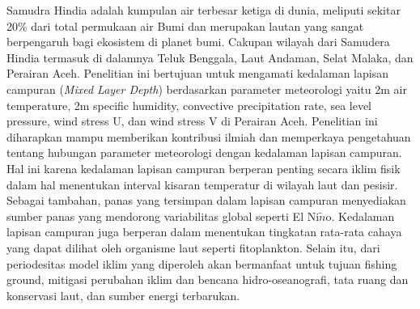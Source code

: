 \begin{spacing}{1.5}
	\pagestyle{empty}
	\begin{center}
		\vskip 1cm
		\justifying
		Samudra Hindia adalah kumpulan air terbesar ketiga di dunia, meliputi sekitar 20\% dari total permukaan air Bumi dan merupakan lautan yang sangat berpengaruh bagi ekosistem di planet bumi. Cakupan wilayah dari Samudera Hindia termasuk di dalamnya Teluk Benggala, Laut Andaman, Selat Malaka, dan Perairan Aceh. Penelitian ini bertujuan untuk mengamati kedalaman lapisan campuran (\textit{Mixed Layer Depth}) berdasarkan parameter meteorologi yaitu 2m air temperature, 2m specific humidity, convective precipitation rate, sea level pressure, wind stress U, dan wind stress V di Perairan Aceh. Penelitian ini diharapkan mampu memberikan kontribusi ilmiah dan memperkaya pengetahuan tentang hubungan parameter meteorologi dengan kedalaman lapisan campuran. Hal ini karena kedalaman lapisan campuran berperan penting secara iklim fisik dalam hal menentukan interval kisaran temperatur di wilayah laut dan pesisir. Sebagai tambahan, panas yang tersimpan dalam lapisan campuran menyediakan sumber panas yang mendorong variabilitas global seperti El Ni$\tilde{n}$o. Kedalaman lapisan campuran juga berperan dalam menentukan tingkatan rata-rata cahaya yang dapat dilihat oleh organisme laut seperti fitoplankton. Selain itu, dari periodesitas model iklim yang diperoleh akan bermanfaat untuk tujuan fishing ground, mitigasi perubahan iklim dan bencana hidro-oseanografi, tata ruang dan konservasi laut, dan sumber energi terbarukan.
	\end{center}
\end{spacing}
\pagestyle{empty}